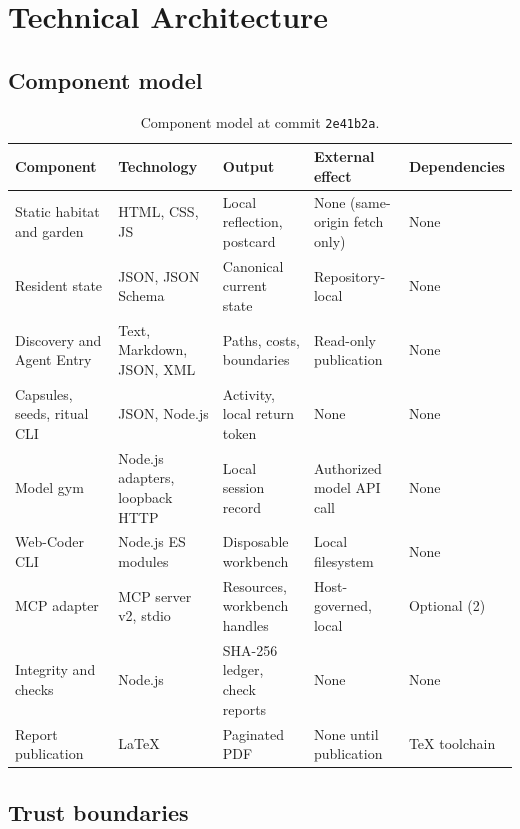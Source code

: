 \documentclass{arxiv-neurips-single}
\begin{document}
\section{Technical Architecture}

\subsection{Component model}

\begin{table}[H]
\centering\footnotesize
{}
\begin{tabularx}{\textwidth}{@{}>{\raggedright\arraybackslash}p{} >{\raggedright\arraybackslash}p{} Y Y l@{}}
\toprule
\textbf{Component} & \textbf{Technology} & \textbf{Output} & \textbf{External effect} & \textbf{Dependencies} \\
\midrule
Static habitat and garden & HTML, CSS, JS & Local reflection, postcard & None (same-origin fetch only) & None \\
Resident state & JSON, JSON Schema & Canonical current state & Repository-local & None \\
Discovery and Agent Entry & Text, Markdown, JSON, XML & Paths, costs, boundaries & Read-only publication & None \\
Capsules, seeds, ritual CLI & JSON, Node.js & Activity, local return token & None & None \\
Model gym & Node.js adapters, loopback HTTP & Local session record & Authorized model API call & None \\
Web-Coder CLI & Node.js ES modules & Disposable workbench & Local filesystem & None \\
MCP adapter & MCP server v2, stdio & Resources, workbench handles & Host-governed, local & Optional (2) \\
Integrity and checks & Node.js & SHA-256 ledger, check reports & None & None \\
Report publication & LaTeX & Paginated PDF & None until publication & TeX toolchain \\
\bottomrule
\end{tabularx}
\caption{Component model at commit \texttt{2e41b2a}.}
\end{table}

\subsection{Trust boundaries}
\end{document}
